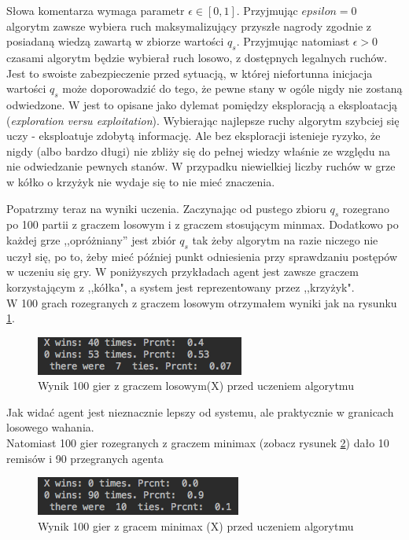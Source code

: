 \documentclass[licencjacka]{pracamgr}
\begin{document}
Słowa komentarza wymaga parametr $\epsilon\in[0,1]$. Przyjmując $epsilon=0$ algorytm zawsze wybiera ruch maksymalizujący przyszłe nagrody zgodnie z posiadaną wiedzą zawartą w zbiorze wartości $q_{s}$. Przyjmując natomiast $\epsilon>0$ czasami algorytm będzie wybierał ruch losowo, z dostępnych legalnych ruchów. Jest to swoiste zabezpieczenie przed sytuacją, w której niefortunna inicjacja wartości $q_{s}$ może doporowadzić do tego, że pewne stany w ogóle nigdy nie zostaną odwiedzone. W \cite{RL} jest to opisane jako dylemat pomiędzy eksploracją a eksploatacją (\textit{exploration versu exploitation}). Wybierając najlepsze ruchy algorytm szybciej się uczy - eksploatuje zdobytą informację. Ale bez eksploracji istenieje ryzyko, że nigdy (albo bardzo długi) nie zbliży się do pełnej wiedzy właśnie ze względu na nie odwiedzanie pewnych stanów.  W przypadku niewielkiej liczby ruchów w grze w kółko o krzyżyk nie wydaje się to nie mieć znaczenia. 

Popatrzmy  teraz na wyniki uczenia. Zaczynając od pustego zbioru $q_{s}$ rozegrano po 100 partii z graczem losowym i z graczem stosującym minmax. Dodatkowo po każdej grze ,,opróżniany'' jest zbiór $q_{s}$ tak żeby algorytm na razie niczego nie uczył się,   po to, żeby mieć później punkt odniesienia przy sprawdzaniu postępów w uczeniu się gry. W poniżyszych przykładach agent jest zawsze graczem korzystającym z ,,kółka", a system jest reprezentowany przez ,,krzyżyk". \\

W 100 grach rozegranych z graczem losowym otrzymałem wyniki jak na rysunku \ref{Rys14}.\\
\begin{figure}[h!]
	\includegraphics [scale=0.7]{Qtable_vs_Rnd_untrained.png}
	\caption{Wynik 100 gier z graczem losowym(X) przed uczeniem algorytmu}
	\label{Rys14}
\end{figure}
Jak widać agent jest nieznacznie lepszy od systemu, ale praktycznie w granicach losowego wahania.\\

Natomiast 100 gier rozegranych z graczem minimax (zobacz rysunek \ref{Rys15}) dało 10 remisów i 90 przegranych agenta\\
\begin{figure}[h!]
	\includegraphics [scale=0.7]{QTable_vs_Minimax_untrained.png}
	\caption{Wynik 100 gier z gracem minimax (X) przed uczeniem algorytmu}
	\label{Rys15}
\end{figure}
\end{document}
